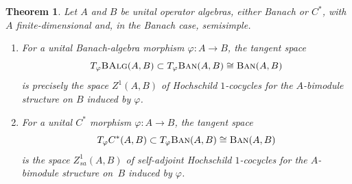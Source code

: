 \documentclass[pdftex]{sigma}
\numberwithin{equation}{section}
\newtheorem{Theorem}{Theorem}[section]
\newcommand{\cat}[1]{\text{\sc #1}}
\begin{document}
\begin{Theorem}\label{th:tgsp}
 Let $A$ and $B$ be unital operator algebras, either Banach or $C^*$, with $A$ finite-dimensional and, in the Banach case, semisimple.
 \begin{enumerate}[$(1)$]\itemsep=0pt
 \item\label{item:bantg} For a unital Banach-algebra morphism $\varphi\colon A\to B$, the tangent space
 \begin{equation}\label{eq:tgban}
 T_{\varphi}\cat{BAlg}(A,B)\subset T_{\varphi}\cat{Ban}(A,B)\cong \cat{Ban}(A,B)
 \end{equation}
 is precisely the space $Z^1(A,B)$ of Hochschild $1$-cocycles for the $A$-bimodule structure on $B$ induced by $\varphi$.

\item\label{item:casttg} For a unital $C^*$ morphism $\varphi\colon A\to B$, the tangent space
 \begin{equation*}
 T_{\varphi}C^*(A,B)\subset T_{\varphi}\cat{Ban}(A,B)\cong \cat{Ban}(A,B)
 \end{equation*}
 is the space $Z_{sa}^1(A,B)$ of self-adjoint Hochschild $1$-cocycles for the $A$-bimodule structure on~$B$ induced by $\varphi$.
\end{enumerate}
\end{Theorem}
\end{document}

